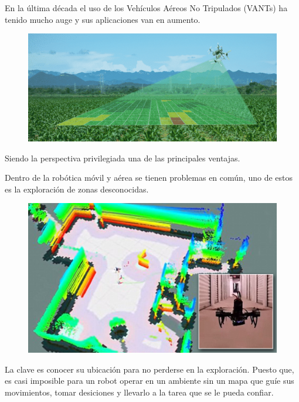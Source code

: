 \documentclass[
	11pt, %
]{beamer}
\begin{document}

\begin{frame}

  En la última década el uso de los Vehículos Aéreos No Tripulados (VANTs) ha tenido mucho auge y sus aplicaciones van en aumento.

  \begin{figure}[h]
    \includegraphics[width=0.7\linewidth]{drone_altura}
  \end{figure}

  Siendo la perspectiva privilegiada una de las principales ventajas.
  
\end{frame}

\begin{frame}

  Dentro de la robótica móvil y aérea se tienen problemas en común, uno de estos es la exploración de zonas desconocidas. 
  
  \begin{figure}[h]
    \includegraphics[width=0.6\linewidth]{drone_mapping}
  \end{figure}

  La clave es conocer su ubicación para no perderse en la exploración. Puesto que, es casi imposible para un robot operar en un ambiente sin un mapa que guíe sus movimientos, tomar desiciones y llevarlo a la tarea que se le pueda confiar.
  
\end{frame}
\end{document}
